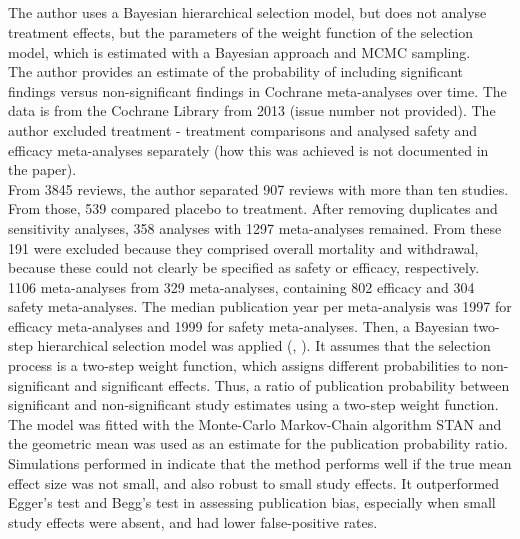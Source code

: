 \documentclass[11pt,a4paper,twoside]{book}\usepackage[]{graphicx}\usepackage[]{color}
\begin{document}
\subsection{\citealp{kicinsky}}
The author uses a Bayesian hierarchical selection model, but does not analyse treatment effects, but the parameters of the weight function of the selection model, which is estimated with a Bayesian approach and MCMC sampling. \\
The author provides an estimate of the probability of including significant findings versus non-significant findings in Cochrane meta-analyses over time. The data is from the Cochrane Library from 2013 (issue number not provided). The author excluded treatment - treatment comparisons and analysed safety and efficacy meta-analyses separately (how this was achieved is not documented in the paper). \\
From 3845 reviews, the author separated 907 reviews with more than ten studies. From those, 539 compared placebo to treatment. After removing duplicates and sensitivity analyses, 358 analyses with 1297 meta-analyses remained. From these 191 were excluded because they comprised overall mortality and withdrawal, because these could not clearly be specified as safety or efficacy, respectively. \\
1106 meta-analyses from 329 meta-analyses, containing 802 efficacy and 304 safety meta-analyses. The median publication year per meta-analysis was 1997 for efficacy meta-analyses and 1999 for safety meta-analyses. Then, a Bayesian two-step hierarchical selection model was applied (\citealp{bayesian.selection.model}, \citealp{bayesian.selection.model.2}). It assumes that the selection process is a two-step weight function, which assigns different probabilities to non-significant and significant effects. Thus, a ratio of publication probability between significant and non-significant study estimates using a two-step weight function. The model was fitted with the Monte-Carlo Markov-Chain algorithm STAN and the geometric mean was used as an estimate for the publication probability ratio. Simulations performed in \citep{bayesian.selection.model} indicate that the method performs well if the true mean effect size was not small, and also robust to small study effects. It outperformed Egger's test and Begg's test in assessing publication bias, especially when small study effects were absent, and had lower false-positive rates. \\
\end{document}
